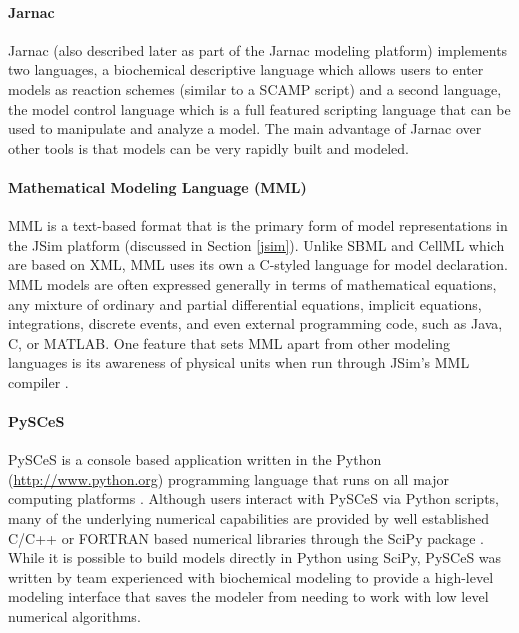 \paragraph{Jarnac}

Jarnac \autocite{sauro:2000} \autocite{bergmann2006sbw} (also described
later as part of the Jarnac modeling platform) implements two languages,
a biochemical descriptive language which allows users to enter models as
reaction schemes (similar to a SCAMP script) and a second language, the
model control language which is a full featured scripting language that
can be used to manipulate and analyze a model. The main advantage of
Jarnac over other tools is that models can be very rapidly built and
modeled.

\paragraph{Mathematical Modeling Language (MML)}

MML is a text-based format that is the primary form of model
representations in the JSim platform \autocite{raymond03} (discussed in
Section \ref{jsim}). Unlike SBML and CellML which are based on XML, MML
uses its own a C-styled language for model declaration. MML models are
often expressed generally in terms of mathematical equations, any
mixture of ordinary and partial differential equations, implicit
equations, integrations, discrete events, and even external programming
code, such as Java, C, or MATLAB. One feature that sets MML apart from
other modeling languages is its awareness of physical units when run
through JSim's MML compiler \autocite{chizeck2009}.

\paragraph{PySCeS}

PySCeS is a console based application written in the Python
(\url{http://www.python.org}) programming language that runs on all
major computing platforms \autocite{Pysces2004}. Although users interact
with PySCeS via Python scripts, many of the underlying numerical
capabilities are provided by well established C/C++ or FORTRAN based
numerical libraries through the SciPy package
\autocite{olivier2002modelling}. While it is possible to build models
directly in Python using SciPy, PySCeS was written by team experienced
with biochemical modeling to provide a high-level modeling interface
that saves the modeler from needing to work with low level numerical
algorithms.

